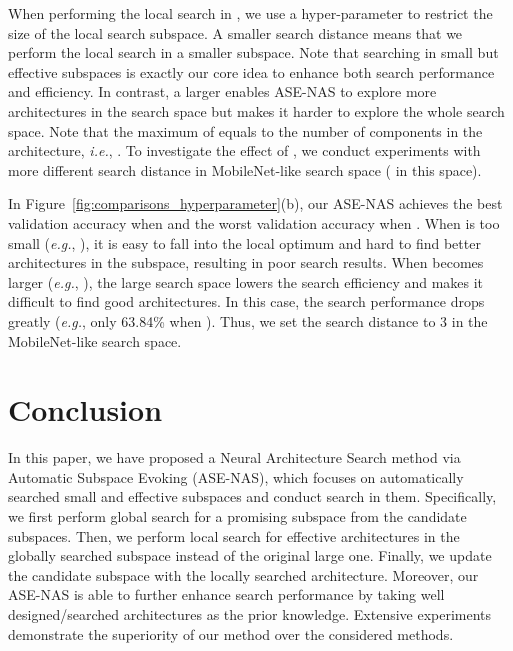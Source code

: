 \documentclass[lettersize,journal]{IEEEtran}
\newcommand{\sexyname}{ASE-NAS\xspace}
\def\eg{\emph{e.g.}} \def\Eg{\emph{E.g.}}
\def\ie{\emph{i.e.}} \def\Ie{\emph{I.e.}}
\begin{document}
When performing the local search in , we use a hyper-parameter  to restrict the size of the local search subspace.
A smaller search distance  means that we perform the local search in a smaller subspace.
Note that searching in small but effective subspaces is exactly our core idea to enhance both search performance and efficiency.
In contrast, a larger  enables \sexyname to explore more architectures in the search space but makes it harder to explore the whole search space.
Note that the maximum of  equals to the number of components  in the architecture, \ie, .
To investigate the effect of , we conduct experiments with more different search distance  in MobileNet-like search space ( in this space). 


In Figure~\ref{fig:comparisons_hyperparameter}(b), our \sexyname achieves the best validation accuracy when  and the worst validation accuracy when . When  is too small (\eg, ), it is easy to fall into the local optimum and hard to find better architectures in the subspace, resulting in poor search results.
When  becomes larger (\eg, ), the large search space lowers the search efficiency and makes it difficult to find good architectures.
In this case, the search performance drops greatly (\eg, only 63.84\% when ).
Thus, we set the search distance  to 3 in the MobileNet-like search space.


\section{Conclusion}

In this paper, we have proposed a Neural Architecture Search method via Automatic Subspace Evoking (\sexyname), which focuses on automatically searched small and effective subspaces and conduct search in them.
Specifically, we first perform global search for a promising subspace from the candidate subspaces.
Then, we perform local search for effective architectures in the globally searched subspace instead of the original large one.
Finally, we update the candidate subspace with the locally searched architecture.
Moreover, our \sexyname is able to further enhance search performance by taking well designed/searched architectures as the prior knowledge.
Extensive experiments demonstrate the superiority of our method over the considered methods.
\end{document}
